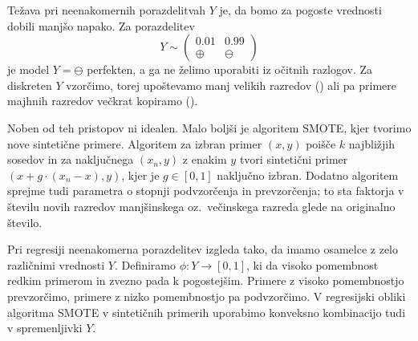
Težava pri neenakomernih porazdelitvah $Y$ je, da bomo za pogoste vrednosti
dobili manjšo napako.
Za porazdelitev
\[
  Y \sim
  \begin{pmatrix}
	0.01 & 0.99 \\
	\oplus & \ominus
  \end{pmatrix}
\]
je model $Y = \ominus$ perfekten, a ga ne želimo uporabiti iz očitnih razlogov.
Za diskreten $Y$ vzorčimo, torej upoštevamo manj velikih razredov
() ali pa primere majhnih razredov večkrat kopiramo
().


Noben od teh pristopov ni idealen.
Malo boljši je algoritem SMOTE, kjer tvorimo nove sintetične primere.
Algoritem za izbran primer $(x,y)$ poišče $k$ najbližjih sosedov in za
naključnega $(x_n, y)$ z enakim $y$ tvori sintetični primer $(x + g \cdot (x_n -
x), y)$, kjer je $g \in [0,1]$ naključno izbran.
Dodatno algoritem sprejme tudi parametra o stopnji podvzorčenja in prevzorčenja;
to sta faktorja v številu novih razredov manjšinskega oz.~večinskega razreda
glede na originalno število.


Pri regresiji neenakomerna porazdelitev izgleda tako, da imamo osamelce z zelo
različnimi vrednosti $Y$.
Definiramo  $\phi: Y \to [0,1]$, ki da visoko
pomembnost redkim primerom in zvezno pada k pogostejšim.
Primere z visoko pomembnostjo prevzorčimo, primere z nizko pomembnostjo pa
podvzorčimo.
V regresijski obliki algoritma SMOTE v sintetičnih primerih uporabimo
konveksno kombinacijo tudi v spremenljivki $Y$.


